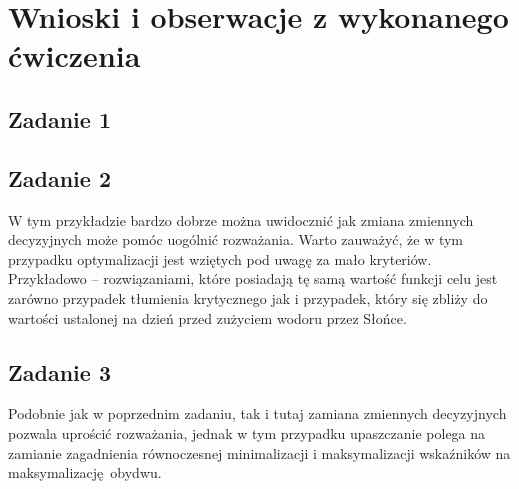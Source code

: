 \documentclass[a4paper, 12pt]{article}
\begin{document}
    \section{Wnioski i obserwacje z wykonanego ćwiczenia}
        \subsection{Zadanie 1}
            
        \subsection{Zadanie 2}
            W tym przykładzie bardzo dobrze można uwidocznić jak zmiana zmiennych decyzyjnych może 
            pomóc uogólnić rozważania. Warto zauważyć, że w tym przypadku optymalizacji jest wziętych
            pod uwagę za mało kryteriów. Przykładowo -- rozwiązaniami, które posiadają tę samą wartość
            funkcji celu jest zarówno przypadek tłumienia krytycznego jak i przypadek, który się zbliży
            do wartości ustalonej na dzień przed zużyciem wodoru przez Słońce. 
        \subsection{Zadanie 3}
            Podobnie jak w poprzednim zadaniu, tak i tutaj zamiana zmiennych decyzyjnych pozwala
            uprościć rozważania, jednak w tym przypadku upaszczanie polega na zamianie zagadnienia
            równoczesnej minimalizacji i maksymalizacji wskaźników na maksymalizację obydwu.
\end{document}
